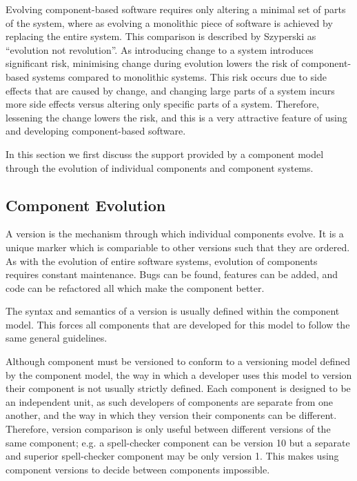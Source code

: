 Evolving component-based software requires only altering a minimal set of parts of the system, 
where as evolving a monolithic piece of software is achieved by replacing the entire system.
This comparison is described by Szyperski \cite{Szyperski2002} as ``evolution not revolution''.
As introducing change to a system introduces significant risk,
minimising change during evolution lowers the risk of component-based systems compared to monolithic systems. 
This risk occurs due to side effects that are caused by change, 
and changing large parts of a system incurs more side effects versus altering only specific parts of a system.
Therefore, lessening the change lowers the risk, and this is a very attractive feature of using and developing component-based software.


{}In this section we first discuss the support provided by a component model through the evolution of individual components and component systems.

\subsection{Component Evolution}


A version is the mechanism through which individual components evolve.
It is a unique marker which is compariable to other versions such that they are ordered.
As with the evolution of entire software systems, evolution of components requires constant maintenance.
Bugs can be found, features can be added, and code can be refactored all which make the component better.

The syntax and semantics of a version is usually defined within the component model.
This forces all components that are developed for this model to follow the same general guidelines.

Although component must be versioned to conform to a versioning model defined by the component model, 
the way in which a developer uses this model to version their component is not usually strictly defined.
Each component is designed to be an independent unit, as such developers of components are separate from one another,
and the way in which they version their components can be different.
Therefore, version comparison is only useful between different versions of the same component;
e.g. a spell-checker component can be version 10 but a separate and superior spell-checker component may be only version 1.
This makes using component versions to decide between components impossible.

